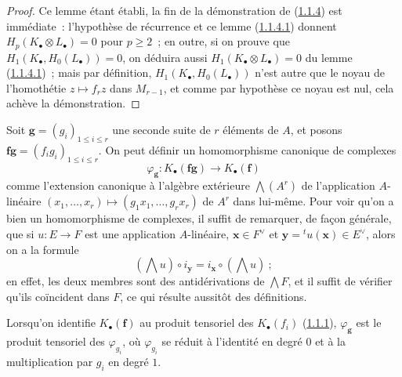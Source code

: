 \begin{proof}
Ce lemme étant établi, la fin de la démonstration de
(\hyperref[III.1.1.4-fr]{1.1.4}) est immédiate~: l'hypothèse de récurrence et
ce lemme (\hyperref[III.1.1.4.1-fr]{1.1.4.1}) donnent
$H_p(K_\bullet\otimes L_\bullet)=0$ pour $p\geq2$~; en outre, si on prouve que
$H_1(K_\bullet,H_0(L_\bullet))=0$, on déduira aussi
$H_1(K_\bullet\otimes L_\bullet)=0$ du lemme
(\hyperref[III.1.1.4.1-fr]{1.1.4.1})~; mais par définition,
$H_1(K_\bullet,H_0(L_\bullet))$ n'est autre que le noyau de l'homothétie
$z\mapsto f_rz$ dans $M_{r-1}$, et comme par hypothèse ce noyau est nul, cela
achève la démonstration.
\end{proof}

\begin{env}[1.1.5]
\label{III.1.1.5-fr}
Soit $\mathbf g=(g_i)_{1\leq i\leq r}$ une seconde suite de $r$ éléments de
$A$, et posons $\mathbf f\mathbf g=(f_ig_i)_{1\leq i\leq r}$. On peut définir
un homomorphisme canonique de complexes
\begin{equation}
\label{III.1.1.5.1-fr}
\tag{1.1.5.1}
\varphi_{\mathbf g}:K_\bullet(\mathbf f\mathbf g)\longrightarrow
K_\bullet(\mathbf f)
\end{equation}
comme l'extension canonique à l'algèbre extérieure $\bigwedge(A^r)$ de
l'application $A$-linéaire
$(x_1,\ldots,x_r)\mapsto(g_1x_1,\ldots,g_rx_r)$ de $A^r$ dans lui-même. Pour
voir qu'on a bien un homomorphisme de complexes, il suffit de remarquer, de
façon générale, que si $u:E\to F$ est une application $A$-linéaire,
$\mathbf x\in F^\vee$ et $\mathbf y={}^tu(\mathbf x)\in E^\vee$, alors on a
la formule
\begin{equation}
\label{III.1.1.5.2-fr}
\tag{1.1.5.2}
(\bigwedge u)\circ i_{\mathbf y}=i_{\mathbf x}\circ(\bigwedge u)~;
\end{equation}
en effet, les deux membres sont des antidérivations de $\bigwedge F$, et il
suffit de vérifier qu'ils coïncident dans $F$, ce qui résulte aussitôt des
définitions.

Lorsqu'on identifie $K_\bullet(\mathbf f)$ au produit tensoriel des
$K_\bullet(f_i)$ (\hyperref[III.1.1.1-fr]{1.1.1}), $\varphi_{\mathbf g}$ est
le produit tensoriel des $\varphi_{g_i}$, où $\varphi_{g_i}$ se réduit à
l'identité en degré $0$ et à la multiplication par $g_i$ en degré $1$.
\end{env}

